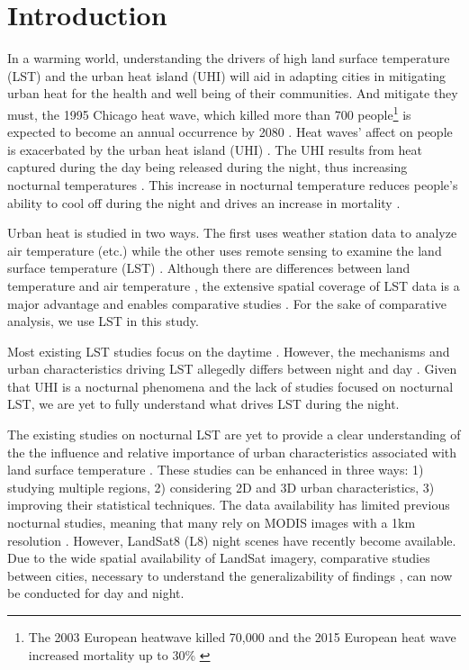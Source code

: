 \documentclass[final,3p,times,twocolumn,sort&compress]{elsarticle}
\begin{document}
\linenumbers

\section{Introduction}
In a warming world, understanding the drivers of high land surface temperature (LST) and the urban heat island (UHI) will aid in adapting cities in mitigating urban heat for the health and well being of their communities.
And mitigate they must, the 1995 Chicago heat wave, which killed more than 700 people\footnote{The 2003 European heatwave killed 70,000 \cite{Robine2008-ky} and the 2015 European heat wave increased mortality up to 30\% \cite{Vicedo-Cabrera2016-si}} is expected to become an annual occurrence by 2080 \cite{klinenberg2015heat}. 
Heat waves' affect on people is exacerbated by the urban heat island (UHI) \cite{Wicki2017-fv, Echevarria_Icaza2016-fr}.
The UHI results from heat captured during the day being released during the night, thus increasing nocturnal temperatures \cite{Oke2002-ta, Landsberg1981-mq, Rotach2005-yu}.
This increase in nocturnal temperature reduces people's ability to cool off during the night and drives an increase in mortality \cite{Echevarria_Icaza2016-fr, Murage2017-wj}.

Urban heat is studied in two ways.
The first uses weather station data to analyze air temperature \cite{Scott2016-lc}(etc.) while the other uses remote sensing to examine the land surface temperature (LST) \cite{Imhoff2010-lf, Peng2012-iy, Peng2018-cp, Zhou2014-wc}.
Although there are differences between land temperature and air temperature \cite{Good2016-yk}, the extensive spatial coverage of LST data is a major advantage and enables comparative studies \cite{Hung2006-qy}.
For the sake of comparative analysis, we use LST in this study.

Most existing LST studies focus on the daytime \cite{Peng2018-cp,Chun2018-so,Wang2019-water,Zhou2018-iy}.
However, the mechanisms and urban characteristics driving LST allegedly differs between night and day \cite{Hung2006-qy, Chun2017-mm, Nichol2005-mm, Wicki2017-fv, Echevarria_Icaza2016-fr,Sobstyl2018-wt, Peng2012-iy, Zhou2014-wc, Zhao2017-cc}. 
Given that UHI is a nocturnal phenomena and the lack of studies focused on nocturnal LST, we are yet to fully understand what drives LST during the night.  

The existing studies on nocturnal LST are yet to provide a clear understanding of the the influence and relative importance of urban characteristics associated with land surface temperature \cite{Chun2017-mm, Echevarria_Icaza2016-fr, Wicki2017-fv, Zhou2014-wc}. 
These studies can be enhanced in three ways: 1) studying multiple regions, 2) considering 2D and 3D urban characteristics, 3) improving their statistical techniques.
The data availability has limited previous nocturnal studies, meaning that many rely on MODIS images with a 1km resolution \cite{Zhou2014-wc, Echevarria_Icaza2016-fr,Wang2019-tree,Peng2012-iy}.
However, LandSat8 (L8) night scenes have recently become available. 
Due to the wide spatial availability of LandSat imagery, comparative studies between cities, necessary to understand the generalizability of findings \cite{Peng2012-iy, Hung2006-qy}, can now be conducted for day and night.
\end{document}

